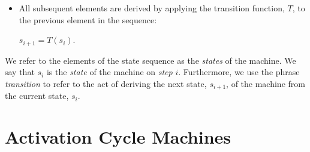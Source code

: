 \documentclass[a4paper,12pt]{article}
\begin{document}
\begin{tcolorbox}
\begin{itemize}
\item All subsequent elements are derived by applying the transition function, $T$, to the previous element in the sequence: 
\begin{center}
$s_{i + 1} = T(s_i)$.
\end{center}

\end{itemize}

\noindent We refer to the elements of the state sequence as the \textit{states} of the machine. We say that $s_i$ is the \textit{state} of the machine on \textit{step} $i$. Furthermore, we use the phrase \textit{transition} to refer to the act of deriving the next state, $s_{i+1}$, of the machine from the current state, $s_i$.

\end{tcolorbox}

\section{Activation Cycle Machines}
\label{section:activation_cycle_machines}
\end{document}
